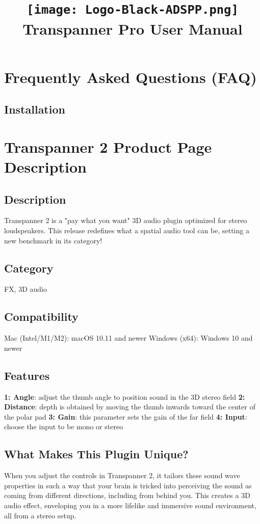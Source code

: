 \documentclass[8pt]{article}
\title{\vspace{-5em}%
\begin{center}%
\texttt{[image: Logo-Black-ADSPP.png]}\\[1em]%
\huge\textbf{Transpanner Pro User Manual}%
\end{center}%
\vspace{-1.5em}}
\date{}
\begin{document}
\section*{Frequently Asked Questions (FAQ)}

\subsection*{Installation}
\section*{Transpanner 2 Product Page Description}

\subsection*{Description}
Transpanner 2 is a "pay what you want" 3D audio plugin optimized for stereo loudspeakers. This release redefines what a spatial audio tool can be, setting a new benchmark in its category!

\subsection*{Category}
FX, 3D audio

\subsection*{Compatibility}
Mac (Intel/M1/M2): macOS 10.11 and newer
Windows (x64): Windows 10 and newer

\subsection*{Features}
\textbf{1: Angle}: adjust the thumb angle to position sound in the 3D stereo field
\textbf{2: Distance}: depth is obtained by moving the thumb inwards toward the center of the polar pad
\textbf{3: Gain}: this parameter sets the gain of the far field
\textbf{4: Input}: choose the input to be mono or stereo

\subsection*{What Makes This Plugin Unique?}
When you adjust the controls in Transpanner 2, it tailors these sound wave properties in such a way that your brain is tricked into perceiving the sound as coming from different directions, including from behind you. This creates a 3D audio effect, enveloping you in a more lifelike and immersive sound environment, all from a stereo setup.
\end{document}
